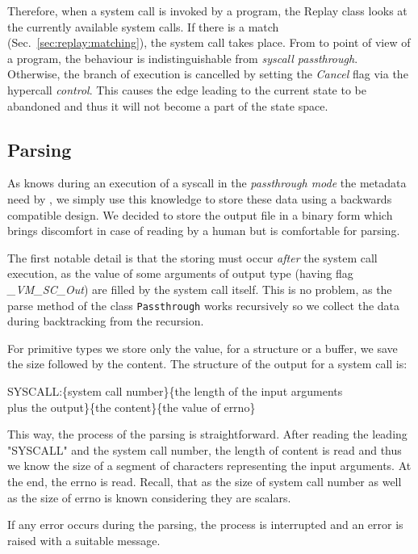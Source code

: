 Therefore, when a system call is invoked by a program, the Replay class looks at the currently available system calls. If there is a match (Sec.~\ref{sec:replay:matching}), the system call takes place. From to point of view of a program, the behaviour is indistinguishable from \textit{syscall passthrough}.  Otherwise, the branch of execution is cancelled by setting the \textit{Cancel} flag via the hypercall \textit{control}. This causes the edge leading to the current state to be abandoned and thus it will not become a part of the state space.

\subsection{Parsing}  \label{sec:replay:parsing}

As \dios knows during an execution of a syscall in the \textit{passthrough mode}  the metadata need by \vmsyscall, we simply use this knowledge to store these data using a backwards compatible design. We decided to store the output file in a binary form which brings discomfort in case of reading by a human but is comfortable for parsing.

The first notable detail is that the storing must occur \textit{after} the system call execution, as the value of some arguments of output type (having flag \textit{\_VM\_SC\_Out}) are filled by the system call itself. This is no problem, as the parse method of the class \texttt{Passthrough} works recursively so we collect the data during backtracking from the recursion.

For primitive types we store only the value, for a structure or a buffer, we save the size followed by the content. The structure of the output for a system call is:

\begin{center}
SYSCALL:\{system call number\}\{the length of the input arguments\\ plus the output\}\{the content\}\{the value of errno\}
\end{center}

This way, the process of the parsing is straightforward. After reading the leading "SYSCALL" and the system call number, the length of content is read and thus we know the size of a segment of characters representing the input arguments. At the end, the errno is read. Recall, that as the size of system call number as well as the size of errno is known considering they are scalars.

If any error occurs during the parsing, the process is interrupted and an error is raised with a suitable message.

